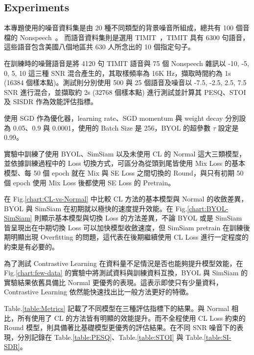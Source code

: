 \documentclass[10pt,twocolumn,letterpaper]{article}
\begin{document}
\begin{CJK}{UTF8}{bkai}
   \section{Experiments}
   本專題使用的噪音資料集是由 20 種不同類型的背景噪音所組成，總共有 100 個音檔的 Nonspeech~\cite{Nonspeech}。
   而語音資料集則是選用 TIMIT~\cite{TIMIT}，TIMIT 具有 6300 句語音，這些語音包含美國八個地區共 630 人所念出的 10
   個指定句子。

   在訓練時的噪聲語音是將 4120 句 TIMIT 語音與 75 個 Nonspeech 雜訊以 -10, -5, 0, 5, 10 這三種 SNR
   混合產生的，其取樣頻率為 16K Hz，擷取時間約為 1s (16384 個樣本點)。測試則分別使用 500 與 25 個語音及噪音以 -7.5,
   -2.5, 2.5, 7.5 SNR 進行混合，並擷取約 2s (32768 個樣本點) 進行測試並計算其 PESQ\cite{PESQ}、STOI\cite{STOI} 及 SISDR\cite{SISDR}
   作為效能評估指標。

   使用 SGD 作為優化器，learning rate、SGD momentum 與 weight decay 分別設為 0.05、0.9 與 0.0001，使用的
   Batch Size 是 256，BYOL 的超參數 $\tau$ 設定是 0.99。

   實驗中訓練了使用 BYOL、SimSiam 以及未使用 CL 的 Normal 這大三類模型，並依據訓練過程中的 Loss
   切換方式，可區分為從頭到尾皆使用 Mix Loss 的基本模型、每 50 個 epoch 就在 Mix 與 SE Loss 之間切換的
   Round，與只有初期 50 個 epoch 使用 Mix Loss 後都使用 SE Loss 的 Pretrain。

   在 Fig.\ref{chart:CL-vs-Normal} 中比較 CL 方法的基本模型與 Normal 的收斂差異，BYOL 與 SimSiam
   在初期就以極快的速度提升效能。在 Fig.\ref{chart:BYOL-SimSiam} 則顯示基本模型與切換 Loss 的方法差異，不論
   BYOL 或是 SimSiam 皆呈現出在中期切換 Loss 可以加快模型收斂速度，但 SimSiam pretrain 在訓練後期明顯出現
   Overfitting 的問題，這代表在後期繼續使用 CL Loss 進行一定程度的約束是有必要的。

   為了測試 Contrastive Learning 在資料量不足情況是否也能夠提升模型效能，在 Fig.\ref{chart:few-data}
   的實驗中將測試資料與訓練資料互換，BYOL 與 SimSiam 的實驗結果依舊具備比 Normal 更優秀的表現。這表示即使只有少量資料，Contrastive
   Learning 依然能快速找出比一般方法更好的特徵。

   Table.\ref{table:Metrics} 記載了不同模型在三種評估指標下的結果。與 Normal 相比，所有使用了 CL
   的方法皆有明顯的效能提升。而不全程使用 CL Loss 約束的 Round 模型，則具備著比基礎模型更優秀的評估結果。在不同 SNR
   噪音下的表現，分別記錄在 Table.\ref{table:PESQ}、Table.\ref{table:STOI} 與 Table.\ref{table:SI-SDR}。


\end{CJK}
\end{document}
